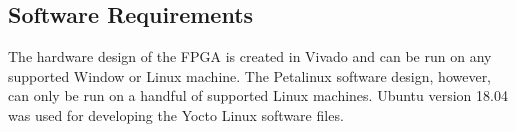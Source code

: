 \documentclass{article}
\begin{document}
\subsection{Software Requirements}
The hardware design of the FPGA is created in Vivado and can be run on any supported Window or Linux machine. The Petalinux software design, however, can only be run on a handful of supported Linux machines. Ubuntu version 18.04 was used for developing the Yocto Linux software files.\par










\end{document}
